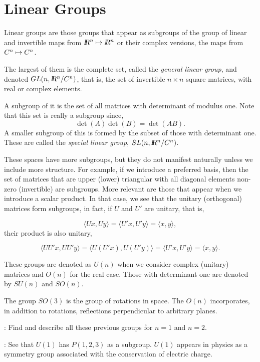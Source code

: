 \section{Linear Groups}

Linear groups are those groups that appear as subgroups of the group of linear and invertible maps from $\ren \mapsto \ren$ or their complex versions, the maps from $C{}^{n} \mapsto C{}^{n}$.

The largest of them is the complete set, called the {\sl general linear group}, and denoted 
$GL(n,\mbox{\sl {l$\!\!\!\;\:\!$R}$^n$} / C{}^{n})$, that is, the set of invertible $n\times n$ square matrices, with 
real or complex elements.

A subgroup of it is the set of all matrices with determinant of modulus one. 
Note that this set is really a subgroup since,
\[
\det(A) \det(B) = \det(AB).
\]
%
A smaller subgroup of this is formed by the subset of those with determinant one. 
These are called the {\sl special linear group}, $SL(n,\mbox{\sl {l$\!\!\!\;\:\!$R}$^n$} / C{}^{n})$.

These spaces have more subgroups, but they do not manifest naturally unless we include more structure. For example, if we introduce a preferred basis, then the set of matrices that are upper (lower) triangular with all diagonal elements non-zero (invertible) are subgroups. More relevant are those that appear when we introduce a scalar product.
In that case, we see that the unitary (orthogonal) matrices form subgroups, 
in fact, if $U$ and $U'$ are unitary, that is, 

\[
\langle Ux, Uy \rangle = \langle U'x, U'y \rangle = \langle x, y \rangle,
\]
% 
their product is also unitary, 

\[
 \langle U U' x, U U'y \rangle =  \langle U (U' x), U (U'y) \rangle = \langle U'x, U'y  \rangle = \langle x, y \rangle.
\]

These groups are denoted as $U(n)$ when we consider complex (unitary) matrices and $O(n)$ for the real case. Those with determinant one are denoted by $SU(n)$ and $SO(n)$.

The group $SO(3)$ is the group of rotations in space. The $O(n)$ incorporates, in addition to rotations, reflections perpendicular to arbitrary planes. 

\ejer: Find and describe all these previous groups for $n=1$ and $n=2$. 

\ejer: See that $U(1)$ has $P(1,2,3)$ as a subgroup. $U(1)$ appears in physics as a symmetry group associated with the conservation of electric charge. 

